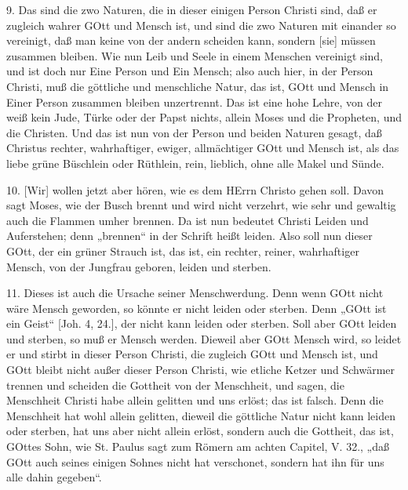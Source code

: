 9. Das sind die zwo Naturen, die in dieser einigen Person Christi sind, daß er zugleich wahrer GOtt und Mensch ist, und sind die zwo Naturen mit einander so vereinigt, daß man keine von der andern scheiden kann, sondern [sie] müssen zusammen bleiben. Wie nun Leib und Seele in einem Menschen vereinigt sind, und ist doch nur Eine Person und Ein Mensch; also auch hier, in der Person Christi, muß die göttliche und menschliche Natur, das ist, GOtt und Mensch in Einer Person zusammen bleiben unzertrennt. Das ist eine hohe Lehre, von der weiß kein Jude, Türke oder der Papst nichts, allein Moses und die Propheten, und die Christen. Und das ist nun von der Person und beiden Naturen gesagt, daß Christus rechter, wahrhaftiger, ewiger, allmächtiger GOtt und Mensch ist, als das liebe grüne Büschlein oder Rüthlein, rein, lieblich, ohne alle Makel und Sünde.

10. [Wir] wollen jetzt aber hören, wie es dem HErrn Christo gehen soll. Davon sagt Moses, wie der Busch brennt und wird nicht verzehrt, wie sehr und gewaltig auch die Flammen umher brennen. Da ist nun bedeutet Christi Leiden und Auferstehen; denn „brennen“ in der Schrift heißt leiden. Also soll nun dieser GOtt, der ein grüner Strauch ist, das ist, ein rechter, reiner, wahrhaftiger Mensch, von der Jungfrau geboren, leiden und sterben.

11. Dieses ist auch die Ursache seiner Menschwerdung. Denn wenn GOtt nicht wäre Mensch geworden, so könnte er nicht leiden oder sterben. Denn „GOtt ist ein Geist“ [Joh. 4, 24.], der nicht kann leiden oder sterben. Soll aber GOtt leiden und sterben, so muß er Mensch werden. Dieweil aber GOtt Mensch wird, so leidet er und stirbt in dieser Person Christi, die zugleich GOtt und Mensch ist, und GOtt bleibt nicht außer dieser Person Christi, wie etliche Ketzer und Schwärmer trennen und scheiden die Gottheit von der Menschheit, und sagen, die Menschheit Christi habe allein gelitten und uns erlöst; das ist falsch. Denn die Menschheit hat wohl allein gelitten, dieweil die göttliche Natur nicht kann leiden oder sterben, hat uns aber nicht allein erlöst, sondern auch die Gottheit, das ist, GOttes Sohn, wie St. Paulus sagt zum Römern am achten Capitel, V. 32., „daß GOtt auch seines einigen Sohnes nicht hat verschonet, sondern hat ihn für uns alle dahin gegeben“.

